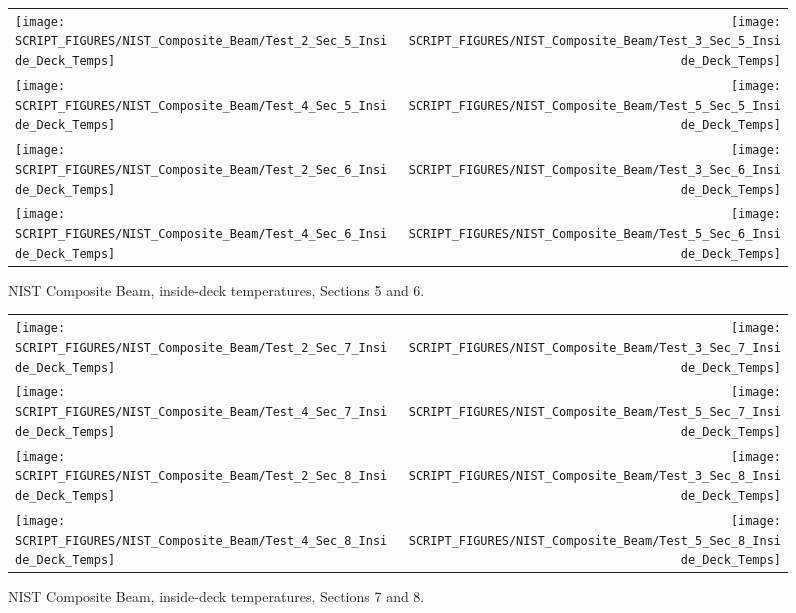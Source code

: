 \begin{figure}[p]
\begin{tabular*}{\textwidth}{l@{\extracolsep{\fill}}r}
\texttt{[image: SCRIPT\_FIGURES/NIST\_Composite\_Beam/Test\_2\_Sec\_5\_Inside\_Deck\_Temps]} &
\texttt{[image: SCRIPT\_FIGURES/NIST\_Composite\_Beam/Test\_3\_Sec\_5\_Inside\_Deck\_Temps]} \\
\texttt{[image: SCRIPT\_FIGURES/NIST\_Composite\_Beam/Test\_4\_Sec\_5\_Inside\_Deck\_Temps]} &
\texttt{[image: SCRIPT\_FIGURES/NIST\_Composite\_Beam/Test\_5\_Sec\_5\_Inside\_Deck\_Temps]} \\
\texttt{[image: SCRIPT\_FIGURES/NIST\_Composite\_Beam/Test\_2\_Sec\_6\_Inside\_Deck\_Temps]} &
\texttt{[image: SCRIPT\_FIGURES/NIST\_Composite\_Beam/Test\_3\_Sec\_6\_Inside\_Deck\_Temps]} \\
\texttt{[image: SCRIPT\_FIGURES/NIST\_Composite\_Beam/Test\_4\_Sec\_6\_Inside\_Deck\_Temps]} &
\texttt{[image: SCRIPT\_FIGURES/NIST\_Composite\_Beam/Test\_5\_Sec\_6\_Inside\_Deck\_Temps]}
\end{tabular*}
\caption[NIST Composite Beam, inside-deck temperatures, Sections 5 and 6]{NIST Composite Beam, inside-deck temperatures, Sections 5 and 6.}
\label{NIST_CB_IDT_5-6}
\end{figure}

\begin{figure}[p]
\begin{tabular*}{\textwidth}{l@{\extracolsep{\fill}}r}
\texttt{[image: SCRIPT\_FIGURES/NIST\_Composite\_Beam/Test\_2\_Sec\_7\_Inside\_Deck\_Temps]} &
\texttt{[image: SCRIPT\_FIGURES/NIST\_Composite\_Beam/Test\_3\_Sec\_7\_Inside\_Deck\_Temps]} \\
\texttt{[image: SCRIPT\_FIGURES/NIST\_Composite\_Beam/Test\_4\_Sec\_7\_Inside\_Deck\_Temps]} &
\texttt{[image: SCRIPT\_FIGURES/NIST\_Composite\_Beam/Test\_5\_Sec\_7\_Inside\_Deck\_Temps]} \\
\texttt{[image: SCRIPT\_FIGURES/NIST\_Composite\_Beam/Test\_2\_Sec\_8\_Inside\_Deck\_Temps]} &
\texttt{[image: SCRIPT\_FIGURES/NIST\_Composite\_Beam/Test\_3\_Sec\_8\_Inside\_Deck\_Temps]} \\
\texttt{[image: SCRIPT\_FIGURES/NIST\_Composite\_Beam/Test\_4\_Sec\_8\_Inside\_Deck\_Temps]} &
\texttt{[image: SCRIPT\_FIGURES/NIST\_Composite\_Beam/Test\_5\_Sec\_8\_Inside\_Deck\_Temps]}
\end{tabular*}
\caption[NIST Composite Beam, inside-deck temperatures, Sections 7 and 8]{NIST Composite Beam, inside-deck temperatures, Sections 7 and 8.}
\label{NIST_CB_IDT_7-8}
\end{figure}




